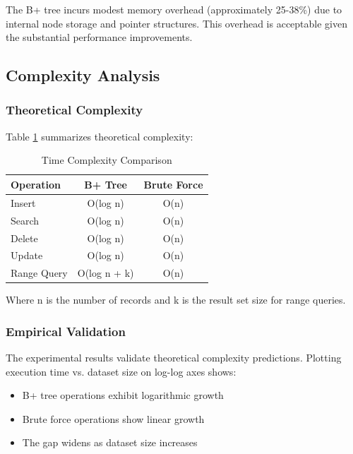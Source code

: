 \documentclass[conference]{IEEEtran}
\begin{document}
The B+ tree incurs modest memory overhead (approximately 25-38\%) due to internal node storage and pointer structures. This overhead is acceptable given the substantial performance improvements.

\subsection{Complexity Analysis}

\subsubsection{Theoretical Complexity}

Table \ref{tab:complexity} summarizes theoretical complexity:

\begin{table}[htbp]
\caption{Time Complexity Comparison}
\begin{center}
\begin{tabular}{|l|c|c|}
\hline
\textbf{Operation} & \textbf{B+ Tree} & \textbf{Brute Force} \\
\hline
Insert & O(log n) & O(n) \\
Search & O(log n) & O(n) \\
Delete & O(log n) & O(n) \\
Update & O(log n) & O(n) \\
Range Query & O(log n + k) & O(n) \\
\hline
\end{tabular}
\label{tab:complexity}
\end{center}
\end{table}

Where n is the number of records and k is the result set size for range queries.

\subsubsection{Empirical Validation}

The experimental results validate theoretical complexity predictions. Plotting execution time vs. dataset size on log-log axes shows:

\begin{itemize}
    \item B+ tree operations exhibit logarithmic growth
    \item Brute force operations show linear growth
    \item The gap widens as dataset size increases
\end{itemize}
\end{document}
